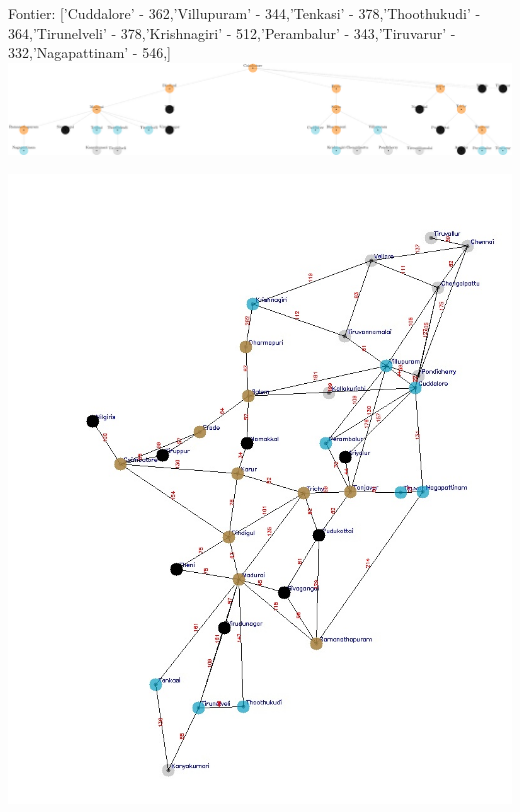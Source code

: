 \documentclass[xcolor=table]{beamer}
\begin{document}
\begin{frame}
  { \tiny Fontier: ['Cuddalore' - 362,'Villupuram' - 344,'Tenkasi' - 378,'Thoothukudi' - 364,'Tirunelveli' - 378,'Krishnagiri' - 512,'Perambalur' - 343,'Tiruvarur' - 332,'Nagapattinam' - 546,]}
  \includegraphics[width=1\textwidth]{../UCSNodes/28-1.png}
  \begin{center}
    \includegraphics[height=0.55\textheight]{../UCSoutput/tamilUCS26.jpg}
  \end{center}
\end{frame}
\end{document}
